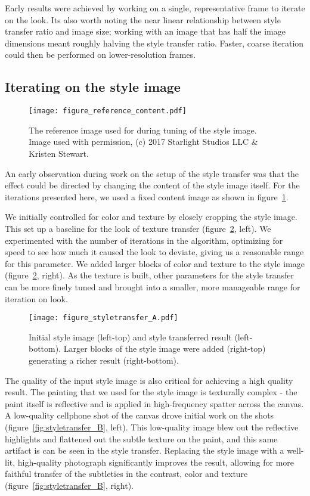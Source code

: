 \documentclass{acmsiggraph}
\begin{document}
Early results were achieved by working on a single, representative frame to iterate on the look. Its also worth noting the near linear relationship between style transfer ratio and image size; working with an image that has half the image dimensions meant roughly halving the style transfer ratio. Faster, coarse iteration could then be performed on lower-resolution frames.

\subsection{Iterating on the style image}
\begin{figure}[ht]
  \centering
  \texttt{[image: figure\_reference\_content.pdf]}
  \caption{The reference image used for during tuning of the style image. Image used with permission, (c) 2017 Starlight Studios LLC \& Kristen Stewart.}
  \label{fig:reference_content}
\end{figure}

An early observation during work on the setup of the style transfer was that the effect could be directed by changing the content of the style image itself. For the iterations presented here, we used a fixed content image as shown in figure~\ref{fig:reference_content}.

We initially controlled for color and texture by closely cropping the style image. This set up a baseline for the look of texture transfer (figure~\ref{fig:styletransfer_A}, left). We experimented with the number of iterations in the algorithm, optimizing for speed to see how much it caused the look to deviate, giving us a reasonable range for this parameter. We added larger blocks of color and texture to the style image (figure~\ref{fig:styletransfer_A}, right). As the texture is built, other parameters for the style transfer can be more finely tuned and brought into a smaller, more manageable range for iteration on look.

\begin{figure}[ht]
  \centering
  \texttt{[image: figure\_styletransfer\_A.pdf]}
  \caption{Initial style image (left-top) and style transferred result (left-bottom). Larger blocks of the style image were added (right-top) generating a richer result (right-bottom).}
  \label{fig:styletransfer_A}
\end{figure}

The quality of the input style image is also critical for achieving a high quality result. The painting that we used for the style image is texturally complex - the paint itself is reflective and is applied in high-frequency spatter across the canvas. A low-quality cellphone shot of the canvas drove initial work on the shots (figure~\ref{fig:styletransfer_B}, left). This low-quality image blew out the reflective highlights and flattened out the subtle texture on the paint, and this same artifact is can be seen in the style transfer. Replacing the style image with a well-lit, high-quality photograph significantly improves the result, allowing for more faithful transfer of the subtleties in the contrast, color and texture (figure~\ref{fig:styletransfer_B}, right).
\end{document}

